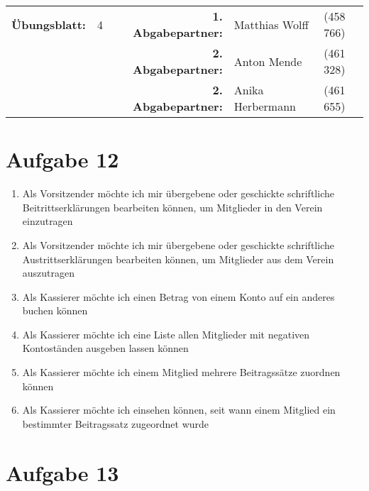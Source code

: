 \newcommand{\obenlinks}{Software Engineering}		%

\usepackage{float}


	\begin{center}
		\begin{tabular}{|rlp{4cm}rll|}
		\hline
		 \textbf{Übungsblatt:} & 4 &   & \textbf{1. Abgabepartner:} & Matthias Wolff & (458 766)  \\
		        & & & \textbf{2. Abgabepartner:} & Anton Mende & (461 328) \\
		        & & & \textbf{2. Abgabepartner:} & Anika Herbermann & (461 655) \\ \hline
		\end{tabular}
	\end{center}
\section*{Aufgabe 12}
\begin{enumerate} [/LF10/)]
	\item Als Vorsitzender möchte ich mir übergebene oder geschickte schriftliche Beitrittserklärungen bearbeiten können, um Mitglieder in den Verein einzutragen
	\item  Als Vorsitzender möchte ich mir übergebene oder geschickte schriftliche Austrittserklärungen bearbeiten können, um Mitglieder aus dem Verein auszutragen
	\item Als Kassierer möchte ich einen Betrag von einem Konto auf ein anderes buchen können
	\item Als Kassierer möchte ich eine Liste allen Mitglieder mit negativen Kontoständen ausgeben lassen können
	\item Als Kassierer möchte ich einem Mitglied mehrere Beitragssätze zuordnen können
	\item Als Kassierer möchte ich einsehen können, seit wann einem Mitglied ein bestimmter Beitragssatz zugeordnet wurde
\end{enumerate}
\newpage 
\section*{Aufgabe 13}
